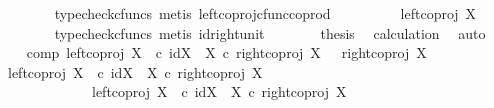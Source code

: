 \begin{isabellebody}
\ \ \ \ \ \ \isamarkupfalse%
\ {\isacharparenleft}{\kern0pt}typecheck{\isacharunderscore}{\kern0pt}cfuncs{\isacharcomma}{\kern0pt}\ metis\ left{\isacharunderscore}{\kern0pt}coproj{\isacharunderscore}{\kern0pt}cfunc{\isacharunderscore}{\kern0pt}coprod{\isacharparenright}{\kern0pt}\isanewline
\ \ \ \ \isamarkupfalse%
\ \isamarkupfalse%
\ {\isachardoublequoteopen}{\isachardot}{\kern0pt}{\isachardot}{\kern0pt}{\isachardot}{\kern0pt}\ {\isacharequal}{\kern0pt}\ left{\isacharunderscore}{\kern0pt}coproj\ X\ {\isasymemptyset}{\isachardoublequoteclose}\isanewline
\ \ \ \ \ \ \isamarkupfalse%
\ {\isacharparenleft}{\kern0pt}typecheck{\isacharunderscore}{\kern0pt}cfuncs{\isacharcomma}{\kern0pt}\ metis\ id{\isacharunderscore}{\kern0pt}right{\isacharunderscore}{\kern0pt}unit{}{\isacharparenright}{\kern0pt}\isanewline
\ \ \ \ \isamarkupfalse%
\ \isamarkupfalse%
\ {\isacharquery}{\kern0pt}thesis\ \isamarkupfalse%
\ calculation\ \isamarkupfalse%
\ auto\isanewline
\ \ \isamarkupfalse%
\isanewline
\ \ \isamarkupfalse%
\ comp{}{\isacharcolon}{\kern0pt}\ {\isachardoublequoteopen}{\isacharparenleft}{\kern0pt}left{\isacharunderscore}{\kern0pt}coproj\ X\ {\isasymemptyset}\ {\isasymcirc}\isactrlsub c\ {\isacharparenleft}{\kern0pt}id{\isacharparenleft}{\kern0pt}X{\isacharparenright}{\kern0pt}\ {\isasymamalg}\ {\isasymalpha}\isactrlbsub X\isactrlesub {\isacharparenright}{\kern0pt}{\isacharparenright}{\kern0pt}\ {\isasymcirc}\isactrlsub c\ right{\isacharunderscore}{\kern0pt}coproj\ X\ {\isasymemptyset}\ {\isacharequal}{\kern0pt}\ right{\isacharunderscore}{\kern0pt}coproj\ X\ {\isasymemptyset}{\isachardoublequoteclose}\isanewline
\ \ \isamarkupfalse%
\ {\isacharminus}{\kern0pt}\isanewline
\ \ \ \ \isamarkupfalse%
\ {\isachardoublequoteopen}{\isacharparenleft}{\kern0pt}{\isacharparenleft}{\kern0pt}left{\isacharunderscore}{\kern0pt}coproj\ X\ {\isasymemptyset}{\isacharparenright}{\kern0pt}\ {\isasymcirc}\isactrlsub c\ {\isacharparenleft}{\kern0pt}id{\isacharparenleft}{\kern0pt}X{\isacharparenright}{\kern0pt}\ {\isasymamalg}\ {\isasymalpha}\isactrlbsub X\isactrlesub {\isacharparenright}{\kern0pt}{\isacharparenright}{\kern0pt}\ {\isasymcirc}\isactrlsub c\ {\isacharparenleft}{\kern0pt}right{\isacharunderscore}{\kern0pt}coproj\ X\ {\isasymemptyset}{\isacharparenright}{\kern0pt}\ {\isacharequal}{\kern0pt}\ \isanewline
\ \ \ \ \ \ \ \ \ \ \ \ \ {\isacharparenleft}{\kern0pt}left{\isacharunderscore}{\kern0pt}coproj\ X\ {\isasymemptyset}{\isacharparenright}{\kern0pt}\ {\isasymcirc}\isactrlsub c\ {\isacharparenleft}{\kern0pt}{\isacharparenleft}{\kern0pt}id{\isacharparenleft}{\kern0pt}X{\isacharparenright}{\kern0pt}\ {\isasymamalg}\ {\isasymalpha}\isactrlbsub X\isactrlesub {\isacharparenright}{\kern0pt}\ {\isasymcirc}\isactrlsub c\ {\isacharparenleft}{\kern0pt}right{\isacharunderscore}{\kern0pt}coproj\ X\ {\isasymemptyset}{\isacharparenright}{\kern0pt}{\isacharparenright}{\kern0pt}{\isachardoublequoteclose}\isanewline

\end{isabellebody}
